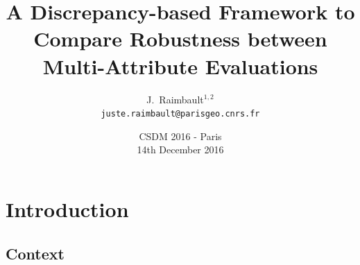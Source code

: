 \documentclass[english,11pt]{beamer}
\begin{document}
\title{A Discrepancy-based Framework to Compare Robustness between Multi-Attribute Evaluations}

\author{J.~Raimbault$^{1,2}$\\
\texttt{juste.raimbault@parisgeo.cnrs.fr}
}




\date{CSDM 2016 - Paris\\\smallskip
14th December 2016
}

\frame{\maketitle}







\section{Introduction}

\subsection{Context}
\end{document}
